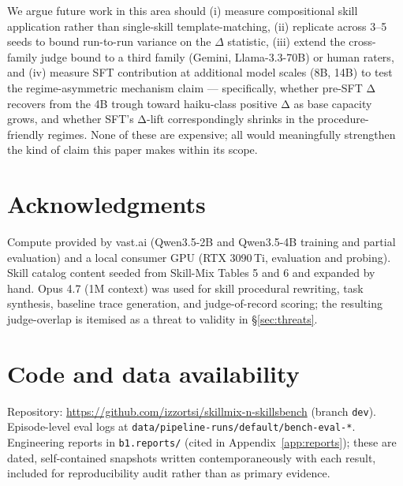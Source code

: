 \documentclass[10pt]{article}
\newcommand{\Qwent}{Qwen3.5-2B\xspace}
\newcommand{\Qwenf}{Qwen3.5-4B\xspace}
\begin{document}
We argue future work in this area should (i) measure compositional skill application rather than single-skill template-matching, (ii) replicate across 3--5 seeds to bound run-to-run variance on the $\Delta$ statistic, (iii) extend the cross-family judge bound to a third family (Gemini, Llama-3.3-70B) or human raters, and (iv) measure SFT contribution at additional model scales (8B, 14B) to test the regime-asymmetric mechanism claim --- specifically, whether pre-SFT Δ recovers from the 4B trough toward haiku-class positive Δ as base capacity grows, and whether SFT's Δ-lift correspondingly shrinks in the procedure-friendly regimes. None of these are expensive; all would meaningfully strengthen the kind of claim this paper makes within its scope.

\section*{Acknowledgments}
Compute provided by vast.ai (\Qwent{} and \Qwenf{} training and partial evaluation) and a local consumer GPU (RTX 3090\,Ti, evaluation and probing). Skill catalog content seeded from Skill-Mix \citep{yu2024skillmix} Tables 5 and 6 and expanded by hand. Opus 4.7 (1M context) was used for skill procedural rewriting, task synthesis, baseline trace generation, and judge-of-record scoring; the resulting judge-overlap is itemised as a threat to validity in \S\ref{sec:threats}.

\section*{Code and data availability}
Repository: \url{https://github.com/izzortsi/skillmix-n-skillsbench} (branch \texttt{dev}). Episode-level eval logs at \texttt{data/pipeline-runs/default/bench-eval-*}. Engineering reports in \texttt{b1.reports/} (cited in Appendix~\ref{app:reports}); these are dated, self-contained snapshots written contemporaneously with each result, included for reproducibility audit rather than as primary evidence.
\end{document}
